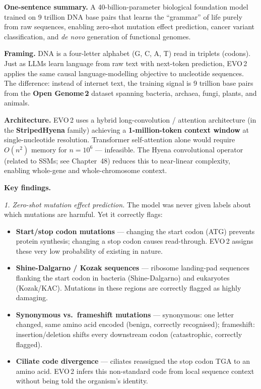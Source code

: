 \begin{paperbox}[title={EVO\,2: Genome Modelling and Design Across All Domains of Life
  (Brixi et al.\ 2025, Arc Institute / Together AI / Stanford, \textit{Nature})}]

\textbf{One-sentence summary.} A 40-billion-parameter biological foundation model
trained on 9 trillion DNA base pairs that learns the ``grammar'' of life purely from
raw sequences, enabling zero-shot mutation effect prediction, cancer variant
classification, and \textit{de novo} generation of functional genomes.

\medskip
\textbf{Framing.} DNA is a four-letter alphabet (G, C, A, T) read in triplets (codons).
Just as LLMs learn language from raw text with next-token prediction, EVO\,2 applies
the same causal language-modelling objective to nucleotide sequences. The difference:
instead of internet text, the training signal is 9 trillion base pairs from the
\textbf{Open Genome\,2} dataset spanning bacteria, archaea, fungi, plants, and animals.

\medskip
\textbf{Architecture.} EVO\,2 uses a hybrid long-convolution / attention architecture
(in the \textbf{StripedHyena} family) achieving a \textbf{1-million-token context
window} at single-nucleotide resolution. Transformer self-attention alone would require
$O(n^2)$ memory for $n = 10^6$ --- infeasible. The Hyena convolutional operator
(related to SSMs; see Chapter~48) reduces this to near-linear complexity, enabling
whole-gene and whole-chromosome context.

\medskip
\textbf{Key findings.}

\textit{1. Zero-shot mutation effect prediction.} The model was never given labels about
which mutations are harmful. Yet it correctly flags:
\begin{itemize}
  \item \textbf{Start/stop codon mutations} --- changing the start codon (ATG) prevents
    protein synthesis; changing a stop codon causes read-through. EVO\,2 assigns these
    very low probability of existing in nature.
  \item \textbf{Shine-Dalgarno / Kozak sequences} --- ribosome landing-pad sequences
    flanking the start codon in bacteria (Shine-Dalgarno) and eukaryotes (Kozak/KAC).
    Mutations in these regions are correctly flagged as highly damaging.
  \item \textbf{Synonymous vs.\ frameshift mutations} --- synonymous: one letter
    changed, same amino acid encoded (benign, correctly recognised); frameshift:
    insertion/deletion shifts every downstream codon (catastrophic, correctly flagged).
  \item \textbf{Ciliate code divergence} --- ciliates reassigned the stop codon TGA to
    an amino acid. EVO\,2 infers this non-standard code from local sequence context
    without being told the organism's identity.
\end{itemize}


\end{paperbox}
